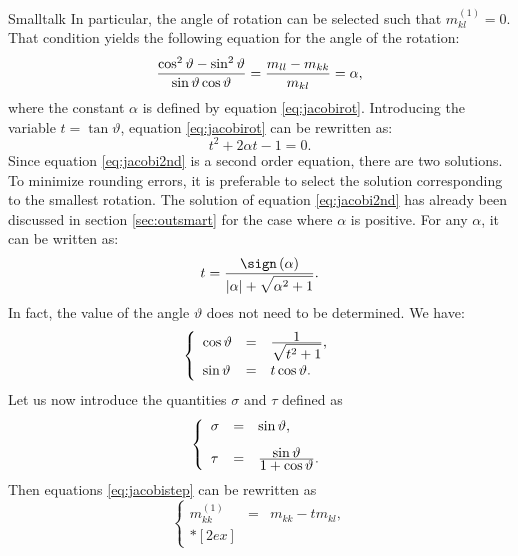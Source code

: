 \begin{displaycode}{Smalltalk}
In particular, the angle of rotation can be selected such that
$m^{\left(1\right)}_{kl}=0$. That condition yields the following
equation for the angle of the rotation:
\begin{equation}
\label{eq:jacobirot}
  {\cos^2\vartheta-\sin^2\vartheta
  \over\sin\vartheta\cos\vartheta}={m_{ll} - m_{kk}\over
  m_{kl}}=\alpha,
\end{equation}
where the constant $\alpha$ is defined by equation
\ref{eq:jacobirot}. Introducing the variable $t=\tan\vartheta$,
equation \ref{eq:jacobirot} can be rewritten as:
\begin{equation}
\label{eq:jacobi2nd}
  t^2+2\alpha t - 1 =0.
\end{equation}
Since equation \ref{eq:jacobi2nd} is a second order equation,
there are two solutions. To minimize rounding errors, it is
preferable to select the solution corresponding to the smallest
rotation\cite{Press}. The solution of equation \ref{eq:jacobi2nd}
has already been discussed in section \ref{sec:outsmart} for the
case where $\alpha$ is positive. For any $\alpha$, it can be
written as:
\begin{equation}
\label{eq:jacobisolinverse}
  t={\displaystyle\sign\left(\alpha\right)\over\displaystyle\left|\alpha\right|+\sqrt{\alpha^2+1}}.
\end{equation}
In fact, the value of the angle $\vartheta$ does not need to be
determined. We have:
\begin{equation}
  \left\{
  \begin{array}{lcl}
    \cos\vartheta&=&{\displaystyle 1\over\displaystyle
    \sqrt{t^2+1}},\\*[2ex]
    \sin\vartheta&=&t\cos\vartheta. \end{array}
  \right.
\end{equation}
Let us now introduce the quantities $\sigma$ and $\tau$ defined as
\begin{equation}
  \left\{
  \begin{array}{lcl}
    \sigma&=&\sin\vartheta,\\*[2ex]
    \tau&=&{\displaystyle\sin\vartheta \over\displaystyle 1+\cos\vartheta}.\end{array}
  \right.
\end{equation}
Then equations \ref{eq:jacobistep} can be rewritten as
\begin{equation}
\label{eq:jacobistepfinal}
  \left\{
  \begin{array}{lcl}
    m^{\left(1\right)}_{kk} &=& m_{kk} - t m_{kl}, \\*[2ex]

\end{array}
\end{equation}
\end{displaycode}
